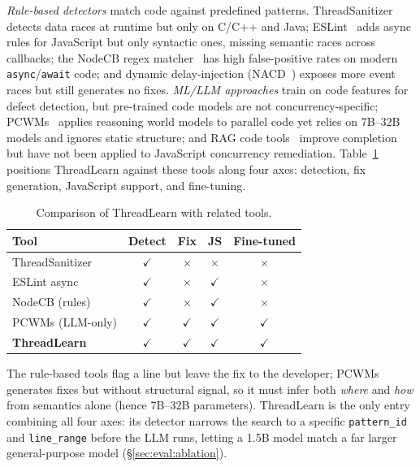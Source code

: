 \documentclass[runningheads]{llncs}
\begin{document}
\emph{Rule-based detectors} match code against predefined patterns.
ThreadSanitizer~\cite{threadsanitizer} detects data races at runtime but
only on C/C++ and Java; ESLint~\cite{eslint} adds async rules for
JavaScript but only syntactic ones, missing semantic races across
callbacks; the NodeCB regex matcher~\cite{nodecb2017} has high
false-positive rates on modern \texttt{async}/\texttt{await} code; and
dynamic delay-injection (NACD~\cite{nacd2025}) exposes more event races but
still generates no fixes.
\emph{ML/LLM approaches} train on code features for defect detection, but
pre-trained code models are not concurrency-specific; PCWMs~\cite{pcwms2026}
applies reasoning world models to parallel code yet relies on 7B--32B
models and ignores static structure; and RAG code tools~\cite{rag_survey}
improve completion but have not been applied to JavaScript concurrency
remediation.
Table~\ref{tab:related} positions ThreadLearn against these tools along
four axes: detection, fix generation, JavaScript support, and fine-tuning.

\begin{table}[tb]
  \centering
  \caption{Comparison of ThreadLearn with related tools.}
  \label{tab:related}
  \begin{tabular}{@{}lcccc@{}}
    \toprule
    \textbf{Tool} & \textbf{Detect} & \textbf{Fix} & \textbf{JS} & \textbf{Fine-tuned} \\
    \midrule
    ThreadSanitizer      & $\checkmark$ & $\times$     & $\times$     & $\times$ \\
    ESLint async         & $\checkmark$ & $\times$     & $\checkmark$ & $\times$ \\
    NodeCB (rules)       & $\checkmark$ & $\times$     & $\checkmark$ & $\times$ \\
    PCWMs (LLM-only)     & $\checkmark$ & $\checkmark$ & $\checkmark$ & $\checkmark$ \\
    \textbf{ThreadLearn} & $\checkmark$ & $\checkmark$ & $\checkmark$ & $\checkmark$ \\
    \bottomrule
  \end{tabular}
\end{table}

The rule-based tools flag a line but leave the fix to the developer;
PCWMs generates fixes but without structural signal, so it must infer both
\emph{where} and \emph{how} from semantics alone (hence 7B--32B parameters).
ThreadLearn is the only entry combining all four axes: its detector narrows
the search to a specific \texttt{pattern\_id} and \texttt{line\_range}
before the LLM runs, letting a 1.5B model match a far larger
general-purpose model (\S\ref{sec:eval:ablation}).
\end{document}

